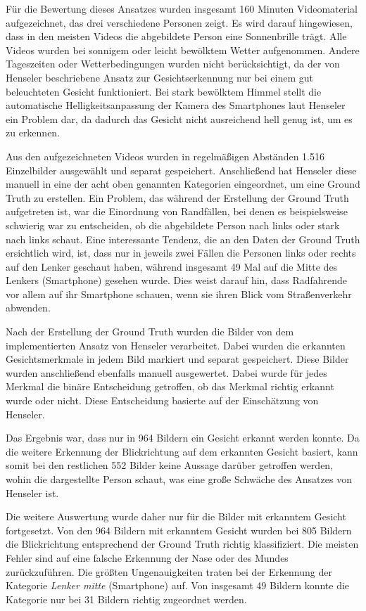 Für die Bewertung dieses Ansatzes wurden insgesamt 160 Minuten Videomaterial aufgezeichnet, das drei verschiedene Personen zeigt. Es wird darauf hingewiesen, dass in den meisten Videos die abgebildete Person eine Sonnenbrille trägt. Alle Videos wurden bei sonnigem oder leicht bewölktem Wetter aufgenommen. Andere Tageszeiten oder Wetterbedingungen wurden nicht berücksichtigt, da der von Henseler beschriebene Ansatz zur Gesichtserkennung nur bei einem gut beleuchteten Gesicht funktioniert. Bei stark bewölktem Himmel stellt die automatische Helligkeitsanpassung der Kamera des Smartphones laut Henseler ein Problem dar, da dadurch das Gesicht nicht ausreichend hell genug ist, um es zu erkennen. 

Aus den aufgezeichneten Videos wurden in regelmäßigen Abständen 1.516 Einzelbilder ausgewählt und separat gespeichert. Anschließend hat Henseler diese manuell in eine der acht oben genannten Kategorien eingeordnet, um eine Ground Truth zu erstellen. Ein Problem, das während der Erstellung der Ground Truth aufgetreten ist, war die Einordnung von Randfällen, bei denen es beispielsweise schwierig war zu entscheiden, ob die abgebildete Person nach links oder stark nach links schaut. Eine interessante Tendenz, die an den Daten der Ground Truth ersichtlich wird, ist, dass nur in jeweils zwei Fällen die Personen links oder rechts auf den Lenker geschaut haben, während insgesamt 49 Mal auf die Mitte des Lenkers (Smartphone) gesehen wurde. Dies weist darauf hin, dass Radfahrende vor allem auf ihr Smartphone schauen, wenn sie ihren Blick vom Straßenverkehr abwenden.

Nach der Erstellung der Ground Truth wurden die Bilder von dem implementierten Ansatz von Henseler verarbeitet. Dabei wurden die erkannten Gesichtsmerkmale in jedem Bild markiert und separat gespeichert. Diese Bilder wurden anschließend ebenfalls manuell ausgewertet. Dabei wurde für jedes Merkmal die binäre Entscheidung getroffen, ob das Merkmal richtig erkannt wurde oder nicht. Diese Entscheidung basierte auf der Einschätzung von Henseler.  

Das Ergebnis war, dass nur in 964 Bildern ein Gesicht erkannt werden konnte. Da die weitere Erkennung der Blickrichtung auf dem erkannten Gesicht basiert, kann somit bei den restlichen 552 Bilder keine Aussage darüber getroffen werden, wohin die dargestellte Person schaut, was eine große Schwäche des Ansatzes von Henseler ist.

Die weitere Auswertung wurde daher nur für die Bilder mit erkanntem Gesicht fortgesetzt. Von den 964 Bildern mit erkanntem Gesicht wurden bei 805 Bildern die Blickrichtung entsprechend der Ground Truth richtig klassifiziert. Die meisten Fehler sind auf eine falsche Erkennung der Nase oder des Mundes zurückzuführen. Die größten Ungenauigkeiten traten bei der Erkennung der Kategorie \textit{Lenker mitte} (Smartphone) auf. Von insgesamt 49 Bildern konnte die Kategorie nur bei 31 Bildern richtig zugeordnet werden.

